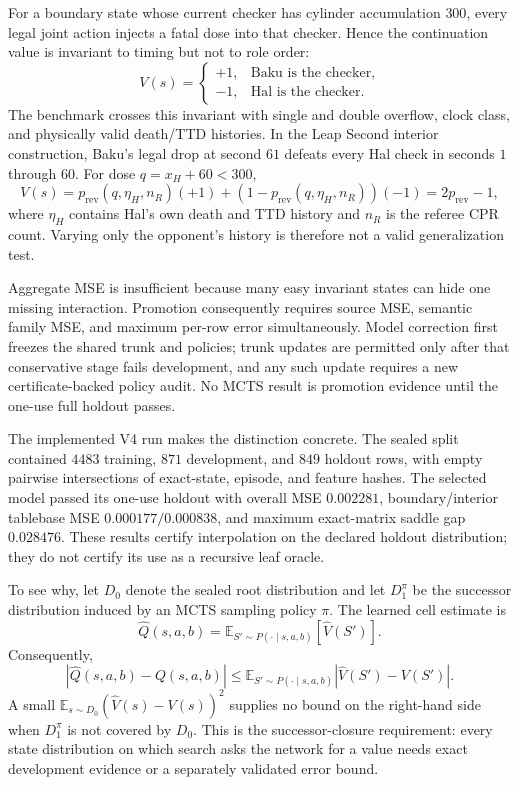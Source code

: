 \documentclass[11pt]{article}
\begin{document}
For a boundary state whose current checker has cylinder accumulation \(300\),
every legal joint action injects a fatal dose into that checker.  Hence the
continuation value is invariant to timing but not to role order:
\[
V(s)=\begin{cases}
+1,&\text{Baku is the checker},\\
-1,&\text{Hal is the checker}.
\end{cases}
\]
The benchmark crosses this invariant with single and double overflow, clock
class, and physically valid death/TTD histories.  In the Leap Second interior
construction, Baku's legal drop at second \(61\) defeats every Hal check in
seconds \(1\) through \(60\).  For dose \(q=x_H+60<300\),
\[
V(s)=p_{\mathrm{rev}}(q,\eta_H,n_R)(+1)
 +(1-p_{\mathrm{rev}}(q,\eta_H,n_R))(-1)
 =2p_{\mathrm{rev}}-1,
\]
where \(\eta_H\) contains Hal's own death and TTD history and \(n_R\) is the
referee CPR count.  Varying only the opponent's history is therefore not a
valid generalization test.

Aggregate MSE is insufficient because many easy invariant states can hide one
missing interaction.  Promotion consequently requires source MSE, semantic
family MSE, and maximum per-row error simultaneously.  Model correction first
freezes the shared trunk and policies; trunk updates are permitted only after
that conservative stage fails development, and any such update requires a new
certificate-backed policy audit.  No MCTS result is promotion evidence until
the one-use full holdout passes.

The implemented V4 run makes the distinction concrete.  The sealed split
contained $4483$ training, $871$ development, and $849$ holdout rows,
with empty pairwise intersections of exact-state, episode, and feature hashes.
The selected model passed its one-use holdout with overall MSE $0.002281$,
boundary/interior tablebase MSE $0.000177/0.000838$, and maximum exact-matrix
saddle gap $0.028476$.  These results certify interpolation on the declared
holdout distribution; they do not certify its use as a recursive leaf oracle.

To see why, let $D_0$ denote the sealed root distribution and let
$D_1^{\pi}$ be the successor distribution induced by an MCTS sampling policy
$\pi$.  The learned cell estimate is
\[
  \widehat Q(s,a,b)
    = \mathbb{E}_{S'\sim P(\cdot\mid s,a,b)}[\widehat V(S')].
\]
Consequently,
\[
  |\widehat Q(s,a,b)-Q(s,a,b)|
  \leq
  \mathbb{E}_{S'\sim P(\cdot\mid s,a,b)}
  |\widehat V(S')-V(S')|.
\]
A small $\mathbb{E}_{s\sim D_0}(\widehat V(s)-V(s))^2$ supplies no bound on
the right-hand side when $D_1^{\pi}$ is not covered by $D_0$.  This is the
successor-closure requirement: every state distribution on which search asks
the network for a value needs exact development evidence or a separately
validated error bound.
\end{document}
